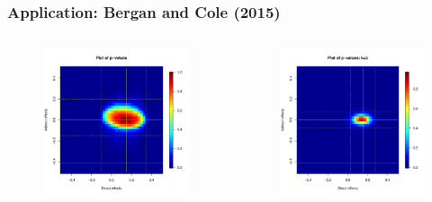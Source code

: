 \documentclass{beamer}
\begin{document}
\begin{frame}
\frametitle{Application: Bergan and Cole (2015)}
\begin{columns}[c]

\begin{figure}
\centering
\includegraphics[scale=0.35]{pval_plot_bergan_main.pdf}
\end{figure}

\begin{figure}
\centering
\includegraphics[scale=0.35]{pval_plot_bergan_ideo_5nn.pdf}
\end{figure}

\end{columns}
\end{frame}
\end{document}
